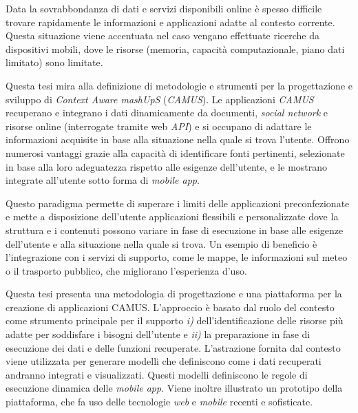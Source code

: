 Data la sovrabbondanza di dati e servizi disponibili online è spesso difficile trovare rapidamente le informazioni e applicazioni adatte al contesto corrente. Questa situazione viene accentuata nel caso vengano effettuate ricerche da dispositivi mobili, dove le risorse (memoria, capacità computazionale, piano dati limitato) sono limitate.

Questa tesi mira alla definizione di metodologie e strumenti per la progettazione e sviluppo di \emph{Context Aware mashUpS} (\emph{CAMUS}). Le applicazioni \emph{CAMUS} recuperano e integrano i dati dinamicamente da documenti, \emph{social network} e risorse online (interrogate tramite web \emph{API}) e si occupano di adattare le informazioni acquisite in base alla situazione nella quale si trova l'utente. Offrono numerosi vantaggi grazie alla capacità di identificare fonti pertinenti, selezionate in base alla loro adeguatezza rispetto alle esigenze dell'utente, e le mostrano integrate all'utente sotto forma di \emph{mobile app}.

Questo paradigma permette di superare i limiti delle applicazioni preconfezionate e mette a disposizione dell'utente applicazioni flessibili e personalizzate dove la struttura e i contenuti possono variare in fase di esecuzione in base alle esigenze dell'utente e alla situazione nella quale si trova. Un esempio di beneficio è l'integrazione con i servizi di supporto, come le mappe, le informazioni sul meteo o il trasporto pubblico, che migliorano l'esperienza d'uso.

Questa tesi presenta una metodologia di progettazione e una piattaforma per la creazione di applicazioni CAMUS. L'approccio è basato dal ruolo del contesto come strumento principale per il supporto \emph{i)} dell'identificazione delle risorse più adatte per soddisfare i bisogni dell'utente e \emph{ii)} la preparazione in fase di esecuzione dei dati e delle funzioni recuperate. L'astrazione fornita dal contesto viene utilizzata per generare modelli che definiscono come i dati recuperati andranno integrati e visualizzati. Questi modelli definiscono le regole di esecuzione dinamica delle \emph{mobile app}. Viene inoltre illustrato un prototipo della piattaforma, che fa uso delle tecnologie \emph{web} e \emph{mobile} recenti e sofisticate.
